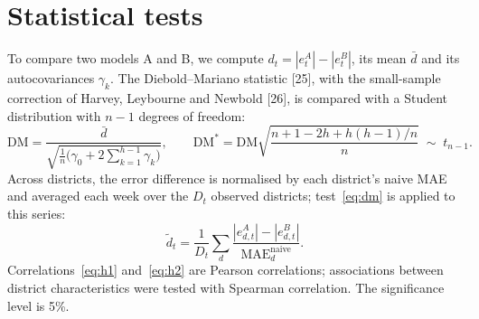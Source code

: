 \documentclass[11pt]{article}
\begin{document}
\section{Statistical tests}
To compare two models A and B, we compute $d_t=|e^{A}_t|-|e^{B}_t|$, its mean $\bar{d}$ and its autocovariances $\gamma_k$. The Diebold–Mariano statistic [25], with the small-sample correction of Harvey, Leybourne and Newbold [26], is compared with a Student distribution with $n-1$ degrees of freedom:
\begin{equation}
\mathrm{DM}=\frac{\bar{d}}{\sqrt{\frac{1}{n}\big(\gamma_0+2\sum_{k=1}^{h-1}\gamma_k\big)}},\qquad \mathrm{DM}^{*}=\mathrm{DM}\sqrt{\frac{n+1-2h+h(h-1)/n}{n}}\;\sim\;t_{n-1}.
\label{eq:dm}
\end{equation}
Across districts, the error difference is normalised by each district's naive MAE and averaged each week over the $D_t$ observed districts; test~\eqref{eq:dm} is applied to this series:
\begin{equation}
\tilde{d}_t=\frac{1}{D_t}\sum_{d}\frac{|e^{A}_{d,t}|-|e^{B}_{d,t}|}{\text{MAE}^{\text{naive}}_d}.
\label{eq:panel}
\end{equation}
Correlations~\eqref{eq:h1} and~\eqref{eq:h2} are Pearson correlations; associations between district characteristics were tested with Spearman correlation. The significance level is 5\%.
\end{document}
